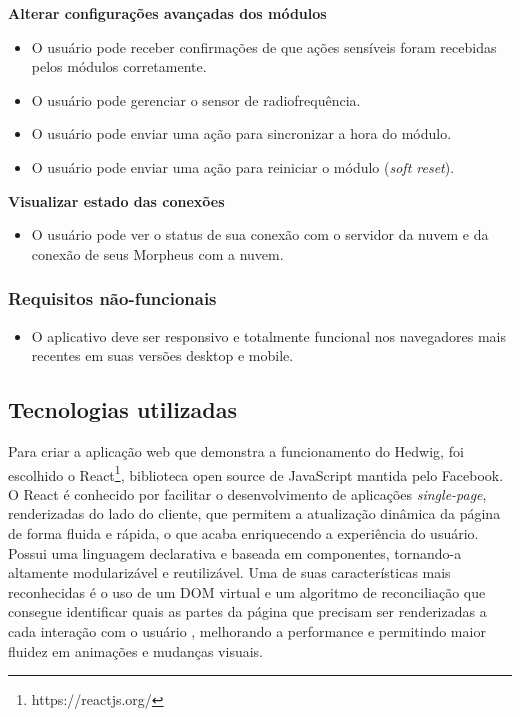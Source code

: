 \begin{description}
\item \textbf{Alterar configurações avançadas dos módulos}

\begin{itemize}
\item O usuário pode receber confirmações de que ações sensíveis foram recebidas pelos módulos corretamente.
\item O usuário pode gerenciar o sensor de radiofrequência.
\item O usuário pode enviar uma ação para sincronizar a hora do módulo.
\item O usuário pode enviar uma ação para reiniciar o módulo (\textit{soft reset}).
\end{itemize}

\item \textbf{Visualizar estado das conexões}

\begin{itemize}
\item O usuário pode ver o status de sua conexão com o servidor da nuvem e da conexão de seus Morpheus com a nuvem.
\end{itemize}

\end{description}

\subsubsection{Requisitos não-funcionais}

\begin{itemize}
\item O aplicativo deve ser responsivo e totalmente funcional nos navegadores mais recentes em suas versões desktop e mobile.
\end{itemize}

\subsection{Tecnologias utilizadas}

Para criar a aplicação web que demonstra a funcionamento do Hedwig, foi escolhido o React\footnote{https://reactjs.org/}, biblioteca open source de JavaScript mantida pelo Facebook. O React é conhecido por facilitar o desenvolvimento de aplicações \textit{single-page}, renderizadas do lado do cliente, que permitem a atualização dinâmica da página de forma fluida e rápida, o que acaba enriquecendo a experiência do usuário. Possui uma linguagem declarativa e baseada em componentes, tornando-a altamente modularizável e reutilizável. Uma de suas características mais reconhecidas é o uso de um DOM virtual e um algoritmo de reconciliação que consegue identificar quais as partes da página que precisam ser renderizadas a cada interação com o usuário \cite{reactdiff}, melhorando a performance e permitindo maior fluidez em animações e mudanças visuais.

